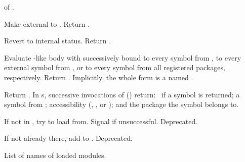 \begin{LIST}{1cm}
  {
     of .
  }

  {
    Make  external to . Return \retval{\T}.
  }

  {
    Revert  to internal status. Return \retval{\T}.
  }
  
  {
    Evaluate -like body with  successively bound to every
    symbol from , to every external symbol from
    , or to every symbol from all registered packages, 
    respectively. Return .  Implicitly,
    the whole form is a  named \NIL. 
  }

  {
    Return . In s, successive
    invocations of  () return: \T\ if a symbol is returned;
    a symbol from ; accessibility
    (, , or ); and the
    package the symbol belongs to.
  }

  {
    If not in , try  to load
     from. Signal  if unsuccessful. Deprecated.
  }

  {
    If not already there, add  to
    . Deprecated. 
  }

  {
    List of names of loaded modules.
  }

\end{LIST}


